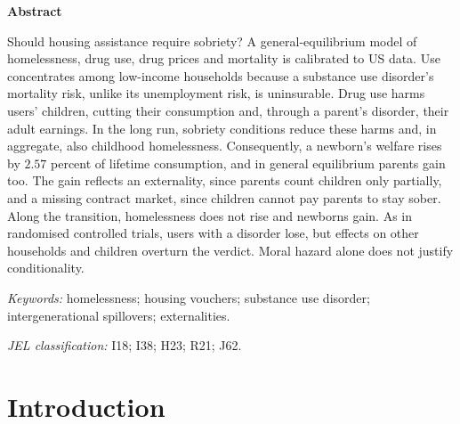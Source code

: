 \documentclass[10pt]{article}
\makeatletter
\newif\ifshowupdates \showupdatesfalse
\newcommand{\listofupdates}{\ifshowupdates\par\noindent{\color{blue}\textbf{Pending updates from the new simulations}}\par
  {\small\@starttoc{upd}}\fi}
\newcommand{\listofwhys}{\ifshowupdates\par\noindent{\color{whygreen}\textbf{Notes on this round's changes}}\par
  {\small\@starttoc{why}}\fi}
\makeatother
\begin{document}
\vspace{0.4em}
\begin{center}
\begin{minipage}{0.86\textwidth}
\begin{center}\textbf{Abstract}\end{center}
\noindent Should housing assistance require sobriety? A general-equilibrium model of homelessness, drug use, drug prices and mortality is calibrated to US data. Use concentrates among low-income households because a substance use disorder's mortality risk, unlike its unemployment risk, is uninsurable. Drug use harms users' children, cutting their consumption and, through a parent's disorder, their adult earnings. In the long run, sobriety conditions reduce these harms and, in aggregate, also childhood homelessness. Consequently, a newborn's welfare rises by $2.57$ percent of lifetime consumption,  and in general equilibrium parents gain too.  The gain reflects an externality, since parents count children only partially, and a missing contract market, since children cannot pay parents to stay sober. Along the transition, homelessness does not rise and newborns gain. As in randomised controlled trials, users with a disorder lose, but effects on other households and children overturn the verdict. Moral hazard alone does not justify conditionality.

\vspace{0.6em}
\noindent\textit{Keywords:} homelessness; housing vouchers; substance
use disorder; intergenerational spillovers; externalities.

\vspace{0.2em}
\noindent\textit{JEL classification:} I18; I38; H23; R21; J62.
\end{minipage}
\end{center}

\vspace{0.8em}


\listofupdates

\listofwhys

\section{Introduction}\label{sec:intro}
\end{document}
